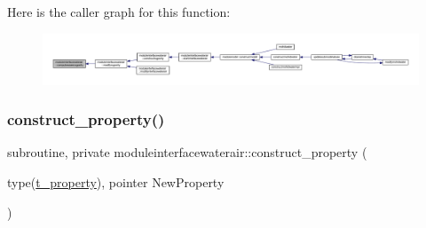 Here is the caller graph for this function\+:\nopagebreak
\begin{figure}[H]
\begin{center}
\leavevmode
\includegraphics[width=350pt]{namespacemoduleinterfacewaterair_abb9a2be6b590714a3c5b58da190ce52f_icgraph}
\end{center}
\end{figure}
\mbox{\label{namespacemoduleinterfacewaterair_a8f499486725a26a9dcb5b2bd07ba3af9}} 
\subsubsection{\texorpdfstring{construct\+\_\+property()}{construct\_property()}}
{\footnotesize\ttfamily subroutine, private moduleinterfacewaterair\+::construct\+\_\+property (\begin{DoxyParamCaption}\item[{type(\mbox{\hyperlink{structmoduleinterfacewaterair_1_1t__property}{t\+\_\+property}}), pointer}]{New\+Property }\end{DoxyParamCaption})\hspace{0.3cm}{\ttfamily [private]}}

